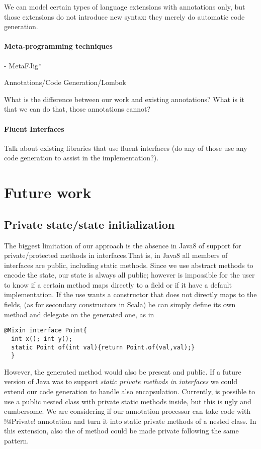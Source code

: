 We can model certain types of language extensions with annotations 
only, but those extensions do not introduce new syntax: they 
merely do automatic code generation. 

\paragraph{Meta-programming techniques}
- MetaFJig*

Annotations/Code Generation/Lombok

What is the difference between our work and existing annotations? 
What is it that we can do that, those annotations cannot?

\paragraph{Fluent Interfaces}

Talk about existing libraries that use fluent interfaces (do any of 
those use any code generation to assist in the implementation?). 


\section{Future work}

\subsection{Private state/state initialization}
The biggest limitation of our approach is the absence in Java8 of support for private/protected methods in interfaces.That is, in Java8 all members of interfaces are public, including static methods.
Since we use abstract methods to encode the state, our state is always all public; however is impossible for the user to know if a certain method maps directly to a field or if it have a default implementation.
If the use wants a constructor that does not directly maps to the fields, (as for secondary constructors in Scala) he can simply define its own \Q@of@ method and delegate on the generated one, as in
\begin{lstlisting}
@Mixin interface Point{
  int x(); int y();
  static Point of(int val){return Point.of(val,val);}  
  }
\end{lstlisting}
However, the generated \Q@of@ method would also be present and public.
If a future version of Java was to support \emph{static private methods in interfaces} we could extend our code generation to handle also encapsulation.
Currently, is possible to use a public nested class with private static methods inside, but this is ugly and cumbersome. We are considering if our annotation processor can take code with \Q!@Private! annotation and turn it into static private methods of a nested class. In this extension,  also the of method could be made private following the same pattern. 

